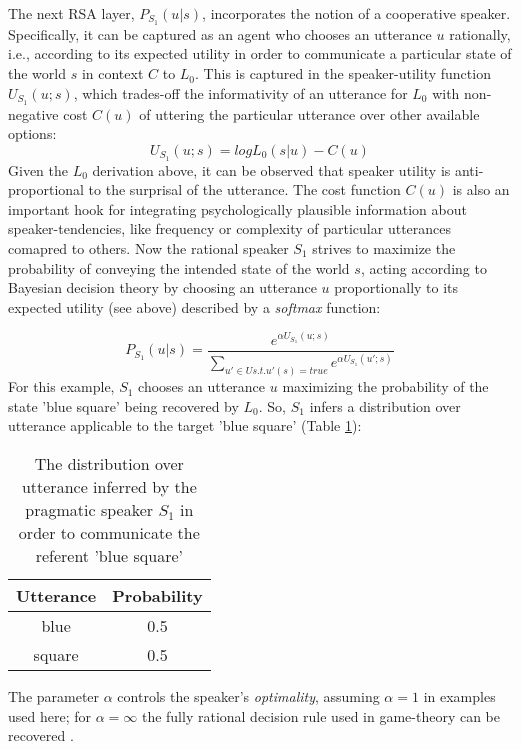 The next RSA layer, $P_{S_1}(u | s)$, incorporates the notion of a cooperative speaker. Specifically, it can be captured as an agent who chooses an utterance $u$ rationally, i.e., according to its expected utility in order to communicate a particular state of the world $s$ in context $C$ to $L_0$. This is captured in the speaker-utility function $U_{S_1}(u; s)$, which trades-off the informativity of an utterance for $L_0$ with non-negative cost $C(u)$ of uttering the particular utterance over other available options:
$$U_{S_1} (u;s) = log L_0(s | u) - C(u)$$
Given the $L_0$ derivation above, it can be observed that speaker utility is anti-proportional to the surprisal of the utterance. %
The cost function $C(u)$ is also an important hook for integrating psychologically plausible information about speaker-tendencies, like frequency or complexity of particular utterances comapred to others. Now the rational speaker $S_1$ strives to maximize the probability of conveying the intended state of the world $s$, acting according to Bayesian decision theory by choosing an utterance $u$ proportionally to its expected utility (see above) described by a \emph{softmax} function:

$$P_{S_1}(u | s) = \frac{e^{\alpha U_{S_1} (u; s)}}{\sum_{u' \in U s.t. u'(s) = true} e^{\alpha U_{S_1} (u'; s)}}$$
For this example, $S_1$ chooses an utterance $u$ maximizing the probability of the state 'blue square' being recovered by $L_0$. So, $S_1$ infers a distribution over utterance applicable to the target 'blue square' (Table \ref{rsa-s1}):

\begin{table}[h]
	\begin{center}
		\caption{The distribution over utterance inferred by the pragmatic speaker $S_1$ in order to communicate the referent 'blue square'}
		\label{rsa-s1}
		\vskip 0.12in
		\begin{tabular}{cc}
			Utterance & Probability \\
			\hline
			blue & 0.5 \\
			square & 0.5
		\end{tabular}
	\end{center}
\end{table}
The parameter $\alpha$ controls the speaker's \emph{optimality}, assuming $\alpha = 1$ in examples used here; for $\alpha = \infty $ the fully rational decision rule used in game-theory can be recovered \parencite{problang, lassiter2017adjectival}.
 
